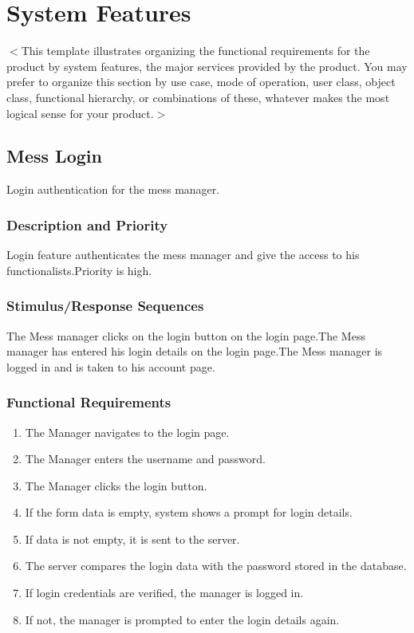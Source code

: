 \documentclass{scrreprt}
\begin{document}
\chapter{System Features}
$<$This template illustrates organizing the functional requirements for the 
product by system features, the major services provided by the product. You may 
prefer to organize this section by use case, mode of operation, user class, 
object class, functional hierarchy, or combinations of these, whatever makes the 
most logical sense for your product.$>$

\section{Mess Login}
Login authentication for the mess manager. 


\subsection{Description and Priority}
Login feature authenticates the mess manager and give the access to his functionalists.Priority is high.

\subsection{Stimulus/Response Sequences}
The Mess manager clicks on the login button on the login  page.The Mess manager has entered his login details on the login
page.The Mess manager is logged in and is taken to his account page.

\subsection{Functional Requirements}
\begin{enumerate}
\item The Manager navigates to the login page.
\item The Manager enters the username and password.
\item The Manager clicks the login button.
\item If the form data is empty, system shows a prompt
for login details.
\item If data is not empty, it is sent to the server.
\item The server compares the login data with the
password stored in the database.
\item If login credentials are verified, the manager is
logged in.
\item If not, the manager is prompted to enter the login
details again.
\end{enumerate}
\end{document}
